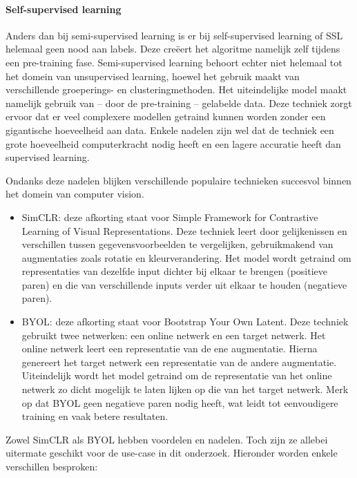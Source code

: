 \paragraph{Self-supervised learning}

Anders dan bij semi-supervised learning is er bij self-supervised learning of SSL helemaal geen nood aan labels. Deze creëert het algoritme namelijk zelf tijdens een pre-training fase. Semi-supervised learning behoort echter niet helemaal tot het domein van unsupervised learning, hoewel het gebruik maakt van verschillende groeperings- en clusteringmethoden. Het uiteindelijke model maakt namelijk gebruik van -- door de pre-training -- gelabelde data. Deze techniek zorgt ervoor dat er veel complexere modellen getraind kunnen worden zonder een gigantische hoeveelheid aan data. Enkele nadelen zijn wel dat de techniek een grote hoeveelheid computerkracht nodig heeft en een lagere accuratie heeft dan supervised learning. \autocite{Gui_2024}

Ondanks deze nadelen blijken verschillende populaire technieken succesvol binnen het domein van computer vision.

\begin{itemize}
    \item SimCLR: deze afkorting staat voor Simple Framework for Contrastive Learning of Visual Representations. Deze techniek leert door gelijkenissen en verschillen tussen gegevensvoorbeelden te vergelijken, gebruikmakend van augmentaties zoals rotatie en kleurverandering. Het model wordt getraind om representaties van dezelfde input dichter bij elkaar te brengen (positieve paren) en die van verschillende inputs verder uit elkaar te houden (negatieve paren). \autocite{Chen_2020}
    \item BYOL: deze afkorting staat voor Bootstrap Your Own Latent. Deze techniek gebruikt twee netwerken: een online netwerk en een target netwerk. Het online netwerk leert een representatie van de ene augmentatie. Hierna genereert het target netwerk een representatie van de andere augmentatie. Uiteindelijk wordt het model getraind om de representatie van het online netwerk zo dicht mogelijk te laten lijken op die van het target netwerk. Merk op dat BYOL geen negatieve paren nodig heeft, wat leidt tot eenvoudigere training en vaak betere resultaten. \autocite{Grill_2020}
\end{itemize}

Zowel SimCLR als BYOL hebben voordelen en nadelen. Toch zijn ze allebei uitermate geschikt voor de use-case in dit onderzoek. Hieronder worden enkele verschillen besproken:

